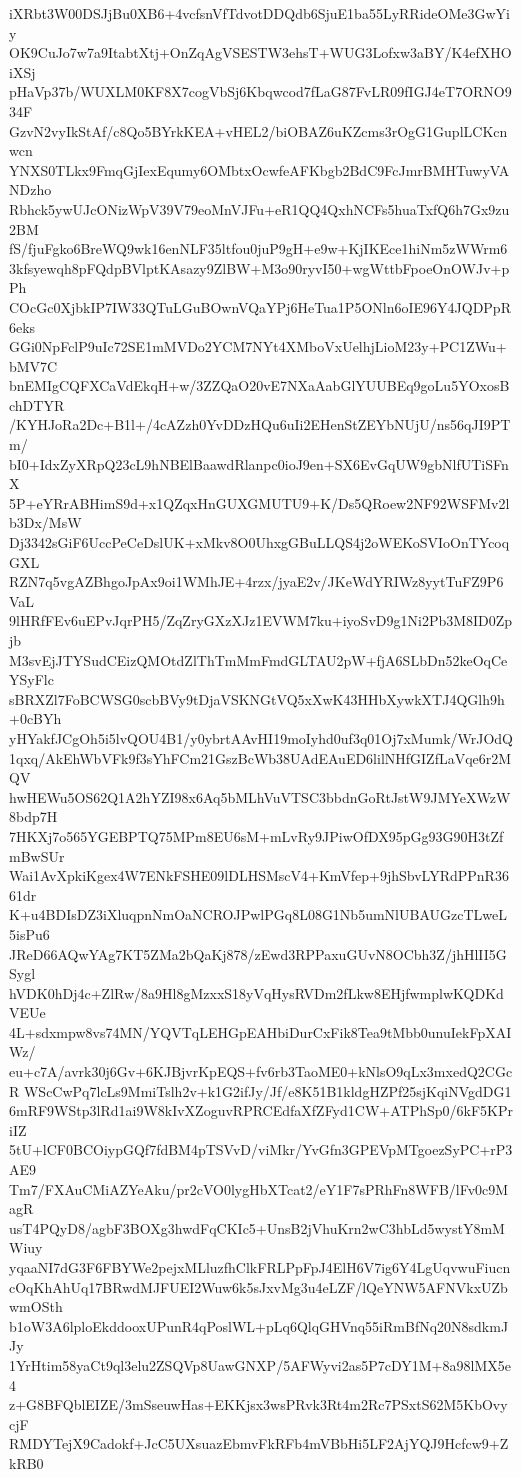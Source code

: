 iXRbt3W00DSJjBu0XB6+4vcfsnVfTdvotDDQdb6SjuE1ba55LyRRideOMe3GwYiy
OK9CuJo7w7a9ItabtXtj+OnZqAgVSESTW3ehsT+WUG3Lofxw3aBY/K4efXHOiXSj
pHaVp37b/WUXLM0KF8X7cogVbSj6Kbqwcod7fLaG87FvLR09fIGJ4eT7ORNO934F
GzvN2vyIkStAf/c8Qo5BYrkKEA+vHEL2/biOBAZ6uKZcms3rOgG1GuplLCKcnwcn
YNXS0TLkx9FmqGjIexEqumy6OMbtxOcwfeAFKbgb2BdC9FcJmrBMHTuwyVANDzho
Rbhck5ywUJcONizWpV39V79eoMnVJFu+eR1QQ4QxhNCFs5huaTxfQ6h7Gx9zu2BM
fS/fjuFgko6BreWQ9wk16enNLF35ltfou0juP9gH+e9w+KjIKEce1hiNm5zWWrm6
3kfsyewqh8pFQdpBVlptKAsazy9ZlBW+M3o90ryvI50+wgWttbFpoeOnOWJv+pPh
COcGc0XjbkIP7IW33QTuLGuBOwnVQaYPj6HeTua1P5ONln6oIE96Y4JQDPpR6eks
GGi0NpFclP9uIc72SE1mMVDo2YCM7NYt4XMboVxUelhjLioM23y+PC1ZWu+bMV7C
bnEMIgCQFXCaVdEkqH+w/3ZZQaO20vE7NXaAabGlYUUBEq9goLu5YOxosBchDTYR
/KYHJoRa2Dc+B1l+/4cAZzh0YvDDzHQu6uIi2EHenStZEYbNUjU/ns56qJI9PTm/
bI0+IdxZyXRpQ23cL9hNBElBaawdRlanpc0ioJ9en+SX6EvGqUW9gbNlfUTiSFnX
5P+eYRrABHimS9d+x1QZqxHnGUXGMUTU9+K/Ds5QRoew2NF92WSFMv2lb3Dx/MsW
Dj3342sGiF6UccPeCeDslUK+xMkv8O0UhxgGBuLLQS4j2oWEKoSVIoOnTYcoqGXL
RZN7q5vgAZBhgoJpAx9oi1WMhJE+4rzx/jyaE2v/JKeWdYRIWz8yytTuFZ9P6VaL
9lHRfFEv6uEPvJqrPH5/ZqZryGXzXJz1EVWM7ku+iyoSvD9g1Ni2Pb3M8ID0Zpjb
M3svEjJTYSudCEizQMOtdZlThTmMmFmdGLTAU2pW+fjA6SLbDn52keOqCeYSyFlc
sBRXZl7FoBCWSG0scbBVy9tDjaVSKNGtVQ5xXwK43HHbXywkXTJ4QGlh9h+0cBYh
yHYakfJCgOh5i5lvQOU4B1/y0ybrtAAvHI19moIyhd0uf3q01Oj7xMumk/WrJOdQ
1qxq/AkEhWbVFk9f3sYhFCm21GszBcWb38UAdEAuED6lilNHfGIZfLaVqe6r2MQV
hwHEWu5OS62Q1A2hYZI98x6Aq5bMLhVuVTSC3bbdnGoRtJstW9JMYeXWzW8bdp7H
7HKXj7o565YGEBPTQ75MPm8EU6sM+mLvRy9JPiwOfDX95pGg93G90H3tZfmBwSUr
Wai1AvXpkiKgex4W7ENkFSHE09lDLHSMscV4+KmVfep+9jhSbvLYRdPPnR3661dr
K+u4BDIsDZ3iXluqpnNmOaNCROJPwlPGq8L08G1Nb5umNlUBAUGzcTLweL5isPu6
JReD66AQwYAg7KT5ZMa2bQaKj878/zEwd3RPPaxuGUvN8OCbh3Z/jhHlII5GSygl
hVDK0hDj4c+ZlRw/8a9Hl8gMzxxS18yVqHysRVDm2fLkw8EHjfwmplwKQDKdVEUe
4L+sdxmpw8vs74MN/YQVTqLEHGpEAHbiDurCxFik8Tea9tMbb0unuIekFpXAIWz/
eu+c7A/avrk30j6Gv+6KJBjvrKpEQS+fv6rb3TaoME0+kNlsO9qLx3mxedQ2CGcR
WScCwPq7lcLs9MmiTslh2v+k1G2ifJy/Jf/e8K51B1kldgHZPf25sjKqiNVgdDG1
6mRF9WStp3lRd1ai9W8kIvXZoguvRPRCEdfaXfZFyd1CW+ATPhSp0/6kF5KPriIZ
5tU+lCF0BCOiypGQf7fdBM4pTSVvD/viMkr/YvGfn3GPEVpMTgoezSyPC+rP3AE9
Tm7/FXAuCMiAZYeAku/pr2cVO0lygHbXTcat2/eY1F7sPRhFn8WFB/lFv0c9MagR
usT4PQyD8/agbF3BOXg3hwdFqCKIc5+UnsB2jVhuKrn2wC3hbLd5wystY8mMWiuy
yqaaNI7dG3F6FBYWe2pejxMLluzfhClkFRLPpFpJ4ElH6V7ig6Y4LgUqvwuFiucn
cOqKhAhUq17BRwdMJFUEI2Wuw6k5sJxvMg3u4eLZF/lQeYNW5AFNVkxUZbwmOSth
b1oW3A6lploEkddooxUPunR4qPoslWL+pLq6QlqGHVnq55iRmBfNq20N8sdkmJJy
1YrHtim58yaCt9ql3elu2ZSQVp8UawGNXP/5AFWyvi2as5P7cDY1M+8a98lMX5e4
z+G8BFQblEIZE/3mSseuwHas+EKKjsx3wsPRvk3Rt4m2Rc7PSxtS62M5KbOvycjF
RMDYTejX9Cadokf+JcC5UXsuazEbmvFkRFb4mVBbHi5LF2AjYQJ9Hcfcw9+ZkRB0
